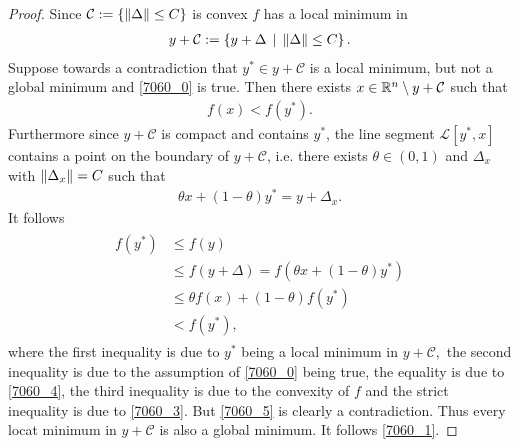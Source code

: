 \begin{proof}
  Since 
  $\mathcal{C}:=\left\{ \left\lVert\Delta\right\rVert\le C \right\}$
  is convex
  $f$ has a local minimum in 
  $
  $
  \begin{gather*}
    y + \mathcal{C}
    :=
    \left\{ 
      y + \Delta \,
      \mid \,
      \left\lVert\Delta\right\rVert\le C
    \right\}
    .
  \end{gather*}
  Suppose towards a contradiction that
  $
    y^* \in 
            y + \mathcal{C}
  $
  is a local minimum, but not a global minimum 
  and
  \eqref{7060_0} is true.
  Then there exists 
  $
    x 
    \in 
    \mathbb{R}^n 
    \setminus 
      y + \mathcal{C}
  $
  such that
  \begin{gather}
    \label{7060_3}
    f(x) < f(y^*)
    .
  \end{gather}
  Furthermore since $y + \mathcal{C}$ is compact and contains $y^*$,
  the line segment $\mathcal{L}[y^*,x]$ contains a point on the boundary of 
  $y + \mathcal{C}$, i.e.
  there exists
  $
    \theta \in (0,1)
  $
  and 
  $
    \Delta_x
  $
  with
  $\left\lVert\Delta_x\right\rVert=C$
  such that
  \begin{gather}
    \label{7060_4}
    \theta x + (1 - \theta) y^* = y + \Delta_x
    .
  \end{gather}
    It follows
    \begin{align}
      \label{7060_5}
      \begin{split}
      f(y^*)
      &\le
      f(y)
      \\
      &\le
      f(y + \Delta)
      =
      f(
        \theta x + (1 - \theta) y^*
      )
      \\
      &\le
      \theta f(x)
      + 
      (1 - \theta)
      f(y^*)
      \\
      &<
      f(y^*)
      ,
      \end{split}
    \end{align}
    where the first inequality is due to
    $y^*$ being a local minimum in
    $
      y + \mathcal{C},
    $
    the second inequality is due to the assumption of 
    \eqref{7060_0} being true,
    the equality is due to \eqref{7060_4},
    the third inequality is due to the convexity of $f$
    and the strict inequality is due to \eqref{7060_3}.
    But \eqref{7060_5} is clearly a contradiction.
    Thus every locat minimum in $y + \mathcal{C}$ is also a global minimum.
    It follows \eqref{7060_1}.
\end{proof}


